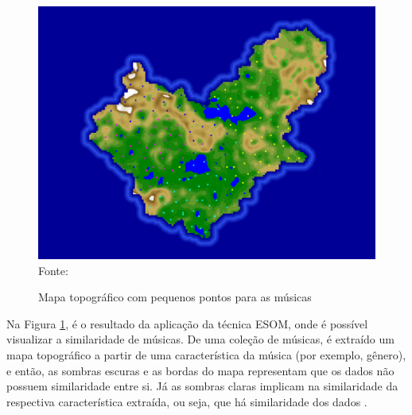 \begin{figure}[!htb]
   \centering
   \caption{Mapa topográfico com pequenos pontos para as músicas}\label{fig:mapaTopografico}
   \includegraphics[scale=0.20]{figuras/musicmap.png}
   \\Fonte: \cite{musicminer}
\end{figure}

Na Figura \ref{fig:mapaTopografico}, é o resultado da aplicação da técnica ESOM, onde é possível visualizar a similaridade de músicas. De uma coleção de músicas, é extraído um mapa topográfico a partir de uma característica da música (por exemplo, gênero), e então, as sombras escuras e as bordas do mapa representam que os dados não possuem similaridade entre si. Já as sombras claras implicam na similaridade da respectiva característica extraída, ou seja, que há similaridade dos dados \cite{lohken2006}.

